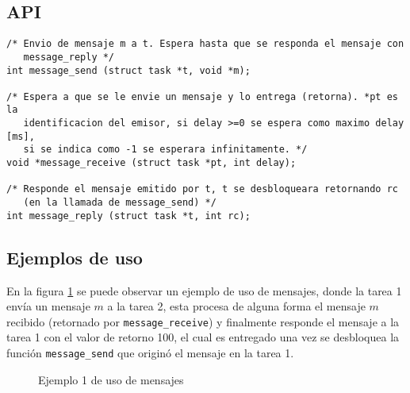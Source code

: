 \subsection{API}

\begin{lstlisting}
/* Envio de mensaje m a t. Espera hasta que se responda el mensaje con
   message_reply */
int message_send (struct task *t, void *m);

/* Espera a que se le envie un mensaje y lo entrega (retorna). *pt es la
   identificacion del emisor, si delay >=0 se espera como maximo delay [ms],
   si se indica como -1 se esperara infinitamente. */
void *message_receive (struct task *pt, int delay);

/* Responde el mensaje emitido por t, t se desbloqueara retornando rc
   (en la llamada de message_send) */
int message_reply (struct task *t, int rc);
\end{lstlisting}

\subsection{Ejemplos de uso}

En la figura \ref{fig:mensajes_ejemplo_1} se puede observar un ejemplo de uso de
mensajes, donde la tarea 1 envía un mensaje $m$ a la tarea 2, esta procesa de
alguna forma el mensaje $m$ recibido (retornado por \texttt{message\_receive}) y
finalmente responde el mensaje a la tarea 1 con el valor de retorno 100, el cual
es entregado una vez se desbloquea la función \texttt{message\_send} que originó
el mensaje en la tarea 1.

\begin{figure}[htbp]
  \centering
  \caption{Ejemplo 1 de uso de mensajes}
  \label{fig:mensajes_ejemplo_1}
\end{figure}

